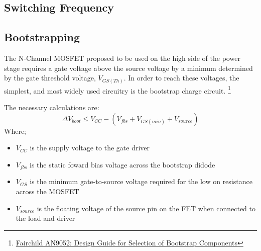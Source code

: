 \subsection{Switching Frequency}

\subsection{Bootstrapping}
The N-Channel MOSFET proposed to be used on the high side of the power stage
requires a gate voltage above the source voltage by a minimum determined by
the gate threshold voltage, $V_{GS(Th)}$. In order to reach these voltages, the
simplest, and most widely used circuitry is the bootstrap charge circuit.
\footnote{\href{https://www.fairchildsemi.com/application-notes/AN/AN-9052.pdf}{Fairchild AN9052: Design Guide for Selection of Bootstrap Components}}

The necessary calculations are:
    \begin{equation}
    \Delta V_{boot} \leq V_{CC} - (V_{fbs}+V_{GS(min)} + V_{source})
    \end{equation}
    Where;
        \begin{itemize}
        \item $V_{CC}$ is the supply voltage to the gate driver
        \item $V_{fbs}$ is the static foward bias voltage across the bootstrap
        didode
        \item $V_{GS}$ is the minimum gate-to-source voltage required for the
        low on resistance across the MOSFET
        \item $V_{source}$ is the floating voltage of the source pin on the FET
        when connected to the load and driver
        \end{itemize}


